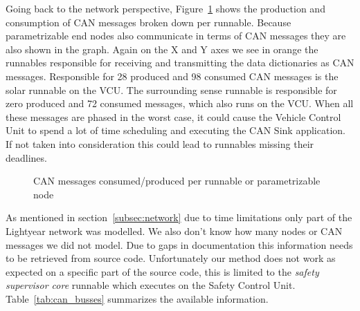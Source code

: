 Going back to the network perspective, Figure~\ref{fig:produce_consume_CAN_runnable} shows the production and consumption of CAN messages broken down per runnable. Because parametrizable end nodes also communicate in terms of CAN messages they are also shown in the graph. Again on the X and Y axes we see in orange the runnables responsible for receiving and transmitting the data dictionaries as CAN messages. Responsible for 28 produced and 98 consumed CAN messages is the solar runnable on the VCU. The surrounding sense runnable is responsible for zero produced and 72 consumed messages, which also runs on the VCU. When all these messages are phased in the worst case, it could cause the Vehicle Control Unit to spend a lot of time scheduling and executing the CAN Sink application. If not taken into consideration this could lead to runnables missing their deadlines.
\begin{figure}[htb]
    \centering
    
    \caption{CAN messages consumed/produced per runnable or parametrizable node}
    \label{fig:produce_consume_CAN_runnable}
\end{figure}

As mentioned in section~\ref{subsec:network} due to time limitations only part of the Lightyear network was modelled. We also don't know how many nodes or CAN messages we did not model. Due to gaps in documentation this information needs to be retrieved from source code. Unfortunately our method does not work as expected on a specific part of the source code, this is limited to the \textit{safety supervisor core} runnable which executes on the Safety Control Unit. Table~\ref{tab:can_busses} summarizes the available information.

